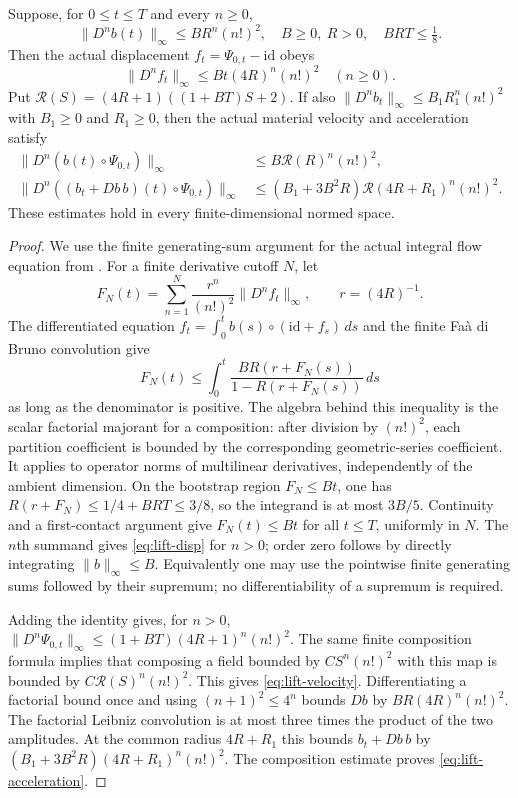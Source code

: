 \begin{lemma}\label{lem:small-lift}
Suppose, for $0\leq t\leq T$ and every $n\geq0$,
\[
 \|D^n b(t)\|_\infty\leq B R^n(n!)^2,
 \quad B\geq0,\ R>0,\quad BRT\leq\tfrac18.
\]
Then the actual displacement $f_t=\Psi_{0,t}-\mathrm{id}$ obeys
\begin{equation}\label{eq:lift-disp}
 \|D^n f_t\|_\infty\leq Bt(4R)^n(n!)^2 \quad(n\geq0).
\end{equation}
Put $\mathscr R(S)=(4R+1)((1+BT)S+2)$.
If also $\|D^n b_t\|_\infty\leq B_1R_1^n(n!)^2$ with
$B_1\ge0$ and $R_1\ge0$, then the actual
material velocity and acceleration satisfy
\begin{align}
 \|D^n(b(t)\circ\Psi_{0,t})\|_\infty
   &\leq B\mathscr R(R)^n(n!)^2,\label{eq:lift-velocity}\\
 \|D^n((b_t+Db\,b)(t)\circ\Psi_{0,t})\|_\infty
   &\leq(B_1+3B^2R)\mathscr R(4R+R_1)^n(n!)^2.
   \label{eq:lift-acceleration}
\end{align}
These estimates hold in every finite-dimensional normed space.
\end{lemma}
\begin{proof}
We use the finite generating-sum argument for the actual integral flow
equation from \cite[\S3.8]{OAI}. For a finite derivative cutoff $N$, let
\[
 F_N(t)=\sum_{n=1}^N\frac{r^n}{(n!)^2}
                 \|D^n f_t\|_\infty,\qquad r=(4R)^{-1}.
\]
The differentiated equation $f_t=\int_0^t b(s)\circ
(\mathrm{id}+f_s)\,ds$ and the finite Fa\`a di Bruno convolution give
\[
 F_N(t)\leq\int_0^t
  \frac{BR(r+F_N(s))}{1-R(r+F_N(s))}\,ds
\]
as long as the denominator is positive. The algebra behind this
inequality is the scalar factorial majorant for a composition: after
division by $(n!)^2$, each partition coefficient is bounded by the
corresponding geometric-series coefficient. It applies to operator
norms of multilinear derivatives, independently of the ambient
dimension. On the bootstrap region $F_N\leq Bt$, one has
$R(r+F_N)\leq1/4+BRT\leq3/8$, so the integrand is at most $3B/5$.
Continuity and a first-contact argument give $F_N(t)\leq Bt$ for all
$t\leq T$, uniformly in $N$. The $n$th summand gives
\eqref{eq:lift-disp} for $n>0$; order zero follows by directly integrating
$\|b\|_\infty\leq B$. Equivalently one may use the pointwise finite
generating sums followed by their supremum; no differentiability of
a supremum is required.

Adding the identity gives, for $n>0$,
$\|D^n\Psi_{0,t}\|_\infty\leq
(1+BT)(4R+1)^n(n!)^2$. The same finite composition formula implies
that composing a field bounded by $C S^n(n!)^2$ with this map is bounded
by $C\mathscr R(S)^n(n!)^2$. This gives
\eqref{eq:lift-velocity}. Differentiating a factorial bound once and
using $(n+1)^2\leq4^n$ bounds $Db$ by $BR(4R)^n(n!)^2$.
The factorial Leibniz convolution is at most three times the product
of the two amplitudes. At the common radius $4R+R_1$ this bounds
$b_t+Db\,b$ by $(B_1+3B^2R)(4R+R_1)^n(n!)^2$.
The composition estimate proves \eqref{eq:lift-acceleration}.
\end{proof}

